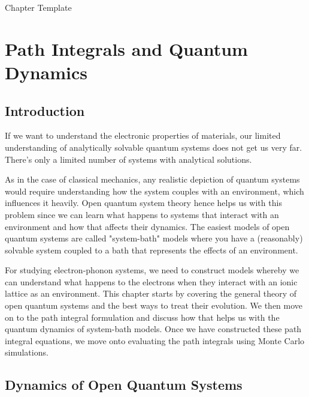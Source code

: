  Chapter Template

\chapter{Path Integrals and Quantum Dynamics} %

\label{Chapter4} %



\section{Introduction}

If we want to understand the electronic properties of materials, our limited understanding of analytically solvable quantum systems does not get us very far. There's only a limited number of systems with analytical solutions.

As in the case of classical mechanics, any realistic depiction of quantum systems would require understanding how the system couples with an environment, which influences it heavily. Open quantum system theory hence helps us with this problem since we can learn what happens to systems that interact with an environment and how that affects their dynamics. The easiest models of open quantum systems are called "system-bath" models where you have a (reasonably) solvable system coupled to a bath that represents the effects of an environment.

For studying electron-phonon systems, we need to construct models whereby we can understand what happens to the electrons when they interact with an ionic lattice as an environment. This chapter starts by covering the general theory of open quantum systems and the best ways to treat their evolution. We then move on to the path integral formulation and discuss how that helps us with the quantum dynamics of system-bath models. Once we have constructed these path integral equations, we move onto evaluating the path integrals using Monte Carlo simulations. 


\section{Dynamics of Open Quantum Systems}

